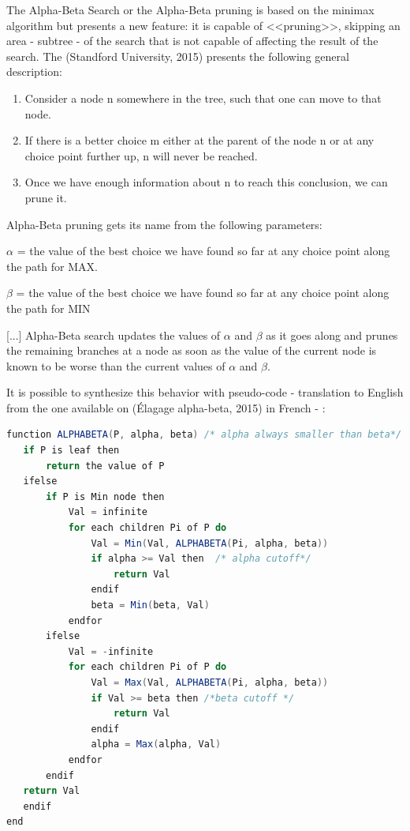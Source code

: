 \vspace{10pt}

The Alpha-Beta Search or the Alpha-Beta pruning is based on the minimax
algorithm but presents a new feature: it is capable of <<pruning>>, skipping an
area - subtree - of the search that is not capable of affecting the result of
the search. The (Standford University, 2015) presents the following general
description:

\begin{enumerate}
  	\item Consider a node n somewhere in the tree, such that one can move to that
  	node.
	\item  If there is a better choice m either at the parent of the node n or at
	any choice point further up, n will never be reached.
	\item Once we have enough information about n to reach this conclusion, we can
	prune it.
\end{enumerate}

Alpha-Beta pruning gets its name from the following parameters:

\vspace{10pt}

\(\alpha \) = the value of the best choice we have found so far at any choice
point along the path for MAX. 

\(\beta\) = the value of the best choice we have found so far at any choice
point along the path for MIN

\vspace{10pt}
[...] Alpha-Beta search updates the values of \(\alpha \) and \(\beta\) as it
goes along and prunes the remaining branches at a node as soon as the value of
the current node is known to be worse than the current values of \(\alpha\) and
\(\beta\).

\vspace{10pt}
It is possible to synthesize this behavior with pseudo-code - translation to English from the one available on (Élagage alpha-beta, 2015) in French - :

\vspace{10pt}

\begin{lstlisting}[language=Java]
function ALPHABETA(P, alpha, beta) /* alpha always smaller than beta*/
   if P is leaf then
       return the value of P
   ifelse
       if P is Min node then
           Val = infinite
           for each children Pi of P do
               Val = Min(Val, ALPHABETA(Pi, alpha, beta))                
               if alpha >= Val then  /* alpha cutoff*/
                   return Val
               endif    
               beta = Min(beta, Val)
           endfor            
       ifelse
           Val = -infinite
           for each children Pi of P do
               Val = Max(Val, ALPHABETA(Pi, alpha, beta))                
               if Val >= beta then /*beta cutoff */
                   return Val
               endif   
               alpha = Max(alpha, Val)
           endfor
       endif
   return Val
   endif
end
\end{lstlisting}

